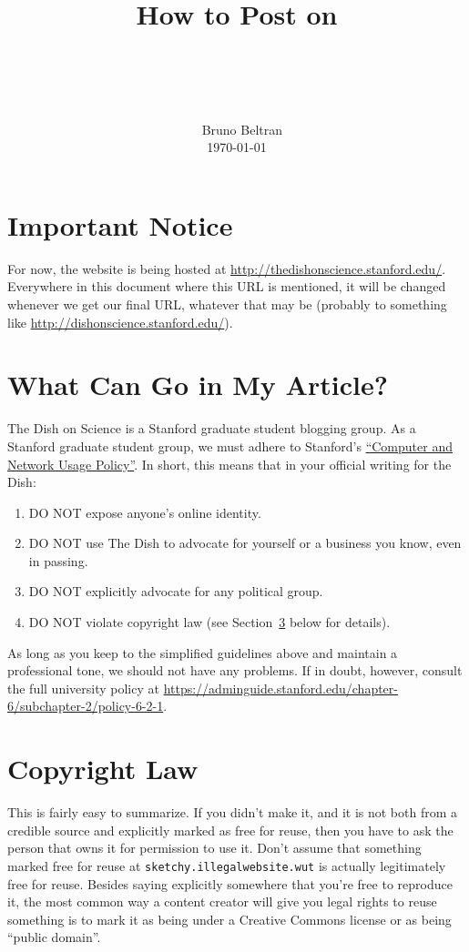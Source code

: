 \documentclass[paper=a4, fontsize=11pt]{scrartcl}
\title{\
        \usefont{OT1}{bch}{b}{n}
        \horrule{0.5pt} \\[0.4cm]
        \huge How to Post on \\ \dishurl{} \\
        \horrule{2pt} \\[0.5cm]
}
\author{\
        \normalfont{}                     \normalsize
        Bruno Beltran\\[-3pt]             \normalsize
        \today
}
\date{}
\numberwithin{equation}{section}        %
\numberwithin{figure}{section}            %
\numberwithin{table}{section}                %
\newcommand{\dishurlplain}[1]{http://thedishonscience.stanford.edu/#1}
\newcommand{\dishurl}[1]{\url{\dishurlplain{#1}}}
\begin{document}
\maketitle

\section{Important Notice}
For now, the website is being hosted at \dishurl{}. Everywhere in this document where this
URL is mentioned, it will be changed whenever we get our final URL, whatever
that may be (probably to something like
\url{http://dishonscience.stanford.edu/}).

\section{What Can Go in My Article?}
The Dish on Science is a Stanford graduate student blogging group.
As a Stanford graduate student group, we must adhere to Stanford's
\href{https://adminguide.stanford.edu/chapter-6/subchapter-2/policy-6-2-1}{``Computer
and Network Usage Policy''}. In short, this means that in your official writing
for the Dish:\@
\begin{enumerate}
    \item DO NOT expose anyone's online identity.
    \item DO NOT use The Dish to advocate for yourself or a business you know,
        even in passing.
    \item DO NOT explicitly advocate for any political group.
    \item DO NOT violate copyright law (see
        Section~\ref{sec:copyright} below for details).
\end{enumerate}

As long as you keep to the simplified guidelines above and maintain a
professional tone, we should not have any problems. If in doubt, however,
consult the full university policy at
\url{https://adminguide.stanford.edu/chapter-6/subchapter-2/policy-6-2-1}.

\section{Copyright Law}\label{sec:copyright}

This is fairly easy to summarize. If you didn't make it, and it is not both from
a credible source and explicitly marked as free for reuse, then you have to ask
the person that owns it for permission to use it. Don't assume that something
marked free for reuse at \texttt{sketchy.illegalwebsite.wut} is actually
legitimately free for reuse.  Besides saying explicitly somewhere that you're
free to reproduce it, the most common way a content creator will give you legal
rights to reuse something is to mark it as being under a Creative Commons
license or as being ``public domain''.
\end{document}
